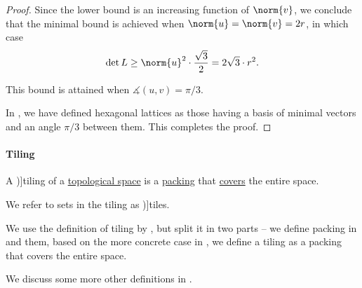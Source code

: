 \begin{proof}
  Since the lower bound is an increasing function of \( \norm{v} \), we conclude that the minimal bound is achieved when \( \norm{u} = \norm{v} = 2r \), in which case
  \begin{equation*}
    \det L \geq \norm{u}^2 \cdot \frac {\sqrt 3} 2 = 2\sqrt 3 \cdot r^2.
  \end{equation*}

  This bound is attained when \( \measuredangle(u, v) = \pi / 3 \).

  In , we have defined hexagonal lattices as those having a basis of minimal vectors and an angle \( \pi / 3 \) between them. This completes the proof.
\end{proof}

\paragraph{Tiling}

\begin{definition}\label{def:topological_space_tiling}
  A \term[ru=паркет / мозайка (\cite[465]{Маркушевич1967АналитическиеФункцииТом2})]{tiling} of a \hyperref[def:topological_space]{topological space} is a \hyperref[def:topological_space_packing]{packing} that \hyperref[def:set_cover]{covers} the entire space.

  We refer to sets in the tiling as \term[ru=плитка (\cite[465]{Маркушевич1967АналитическиеФункцииТом2})]{tiles}.
\end{definition}
\begin{comments}
  \item We use the definition of tiling by , but split it in two parts -- we define packing in  and them, based on the more concrete case in , we define a tiling as a packing that covers the entire space.

  \item We discuss some more other definitions in .
\end{comments}

